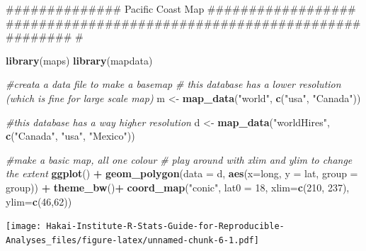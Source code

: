 \documentclass[]{book}
\newenvironment{Shaded}{\begin{snugshade}}{\end{snugshade}}
\newcommand{\KeywordTok}[1]{\textcolor[rgb]{0.13,0.29,0.53}{\textbf{#1}}}
\newcommand{\DataTypeTok}[1]{\textcolor[rgb]{0.13,0.29,0.53}{#1}}
\newcommand{\DecValTok}[1]{\textcolor[rgb]{0.00,0.00,0.81}{#1}}
\newcommand{\StringTok}[1]{\textcolor[rgb]{0.31,0.60,0.02}{#1}}
\newcommand{\CommentTok}[1]{\textcolor[rgb]{0.56,0.35,0.01}{\textit{#1}}}
\newcommand{\OperatorTok}[1]{\textcolor[rgb]{0.81,0.36,0.00}{\textbf{#1}}}
\newcommand{\NormalTok}[1]{#1}
\begin{document}
\begin{Shaded}
\begin{Highlighting}[]
\NormalTok{############## Pacific Coast Map ##################}
\NormalTok{################################################### #}

\KeywordTok{library}\NormalTok{(maps)}
\KeywordTok{library}\NormalTok{(mapdata)}

\CommentTok{#creata a data file to make a basemap}
\CommentTok{# this database has a lower resolution (which is fine for large scale map)}
\NormalTok{m <-}\StringTok{ }\KeywordTok{map_data}\NormalTok{(}\StringTok{"world"}\NormalTok{, }\KeywordTok{c}\NormalTok{(}\StringTok{"usa"}\NormalTok{, }\StringTok{"Canada"}\NormalTok{))}

\CommentTok{#this database has a way higher resolution}
\NormalTok{d <-}\StringTok{ }\KeywordTok{map_data}\NormalTok{(}\StringTok{"worldHires"}\NormalTok{, }\KeywordTok{c}\NormalTok{(}\StringTok{"Canada"}\NormalTok{, }\StringTok{"usa"}\NormalTok{, }\StringTok{"Mexico"}\NormalTok{))}

\CommentTok{#make a basic map, all one colour}
\CommentTok{# play around with xlim and ylim to change the extent}
\KeywordTok{ggplot}\NormalTok{() }\OperatorTok{+}\StringTok{ }\KeywordTok{geom_polygon}\NormalTok{(}\DataTypeTok{data =}\NormalTok{ d, }\KeywordTok{aes}\NormalTok{(}\DataTypeTok{x=}\NormalTok{long, }\DataTypeTok{y =}\NormalTok{ lat, }\DataTypeTok{group =}\NormalTok{ group)) }\OperatorTok{+}\StringTok{ }\KeywordTok{theme_bw}\NormalTok{()}\OperatorTok{+}
\StringTok{  }\KeywordTok{coord_map}\NormalTok{(}\StringTok{"conic"}\NormalTok{, }\DataTypeTok{lat0 =} \DecValTok{18}\NormalTok{, }\DataTypeTok{xlim=}\KeywordTok{c}\NormalTok{(}\DecValTok{210}\NormalTok{, }\DecValTok{237}\NormalTok{), }\DataTypeTok{ylim=}\KeywordTok{c}\NormalTok{(}\DecValTok{46}\NormalTok{,}\DecValTok{62}\NormalTok{))}
\end{Highlighting}
\end{Shaded}

\texttt{[image: Hakai-Institute-R-Stats-Guide-for-Reproducible-Analyses\_files/figure-latex/unnamed-chunk-6-1.pdf]}
\end{document}
